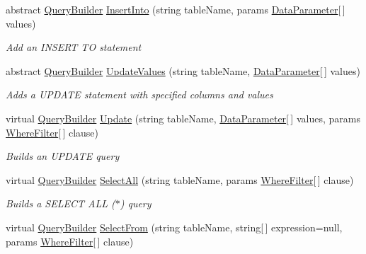 \begin{DoxyCompactItemize}
abstract \hyperlink{class_o_t_a_1_1_data_1_1_query_builder}{Query\+Builder} \hyperlink{class_o_t_a_1_1_data_1_1_query_builder_a3440be75bb8f29a92c71bbcdb65f2c6e}{Insert\+Into} (string table\+Name, params \hyperlink{struct_o_t_a_1_1_data_1_1_data_parameter}{Data\+Parameter}\mbox{[}$\,$\mbox{]} values)
\begin{DoxyCompactList}\small\item\em Add an I\+N\+S\+E\+R\+T T\+O statement \end{DoxyCompactList}\item 
abstract \hyperlink{class_o_t_a_1_1_data_1_1_query_builder}{Query\+Builder} \hyperlink{class_o_t_a_1_1_data_1_1_query_builder_a9a356af47be360d3ac3158dceb8055e3}{Update\+Values} (string table\+Name, \hyperlink{struct_o_t_a_1_1_data_1_1_data_parameter}{Data\+Parameter}\mbox{[}$\,$\mbox{]} values)
\begin{DoxyCompactList}\small\item\em Adds a U\+P\+D\+A\+T\+E statement with specified columns and values \end{DoxyCompactList}\item 
virtual \hyperlink{class_o_t_a_1_1_data_1_1_query_builder}{Query\+Builder} \hyperlink{class_o_t_a_1_1_data_1_1_query_builder_ad44f2ffcad6b08c4a1305234687c38d7}{Update} (string table\+Name, \hyperlink{struct_o_t_a_1_1_data_1_1_data_parameter}{Data\+Parameter}\mbox{[}$\,$\mbox{]} values, params \hyperlink{struct_o_t_a_1_1_data_1_1_where_filter}{Where\+Filter}\mbox{[}$\,$\mbox{]} clause)
\begin{DoxyCompactList}\small\item\em Builds an U\+P\+D\+A\+T\+E query \end{DoxyCompactList}\item 
virtual \hyperlink{class_o_t_a_1_1_data_1_1_query_builder}{Query\+Builder} \hyperlink{class_o_t_a_1_1_data_1_1_query_builder_a9972c62d1af55d1671c601f3bfafde28}{Select\+All} (string table\+Name, params \hyperlink{struct_o_t_a_1_1_data_1_1_where_filter}{Where\+Filter}\mbox{[}$\,$\mbox{]} clause)
\begin{DoxyCompactList}\small\item\em Builds a S\+E\+L\+E\+C\+T A\+L\+L ($\ast$) query \end{DoxyCompactList}\item 
virtual \hyperlink{class_o_t_a_1_1_data_1_1_query_builder}{Query\+Builder} \hyperlink{class_o_t_a_1_1_data_1_1_query_builder_a3bee0a4cb70bae6b562b550a2f86f74a}{Select\+From} (string table\+Name, string\mbox{[}$\,$\mbox{]} expression=null, params \hyperlink{struct_o_t_a_1_1_data_1_1_where_filter}{Where\+Filter}\mbox{[}$\,$\mbox{]} clause)

\end{DoxyCompactItemize}
